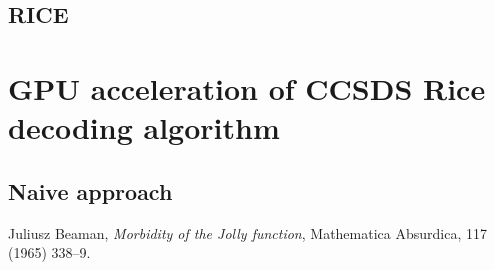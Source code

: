 \documentclass[licencjacka,en]{pracamgr}
\begin{document}
\section{RICE}

\chapter{GPU acceleration of CCSDS Rice decoding algorithm}\label{r:losers}

\section{Naive approach}







\begin{thebibliography}{99}

     Juliusz Beaman, \textit{Morbidity of the Jolly
        function}, Mathematica Absurdica, 117 (1965) 338--9.


\end{thebibliography}
\end{document}
